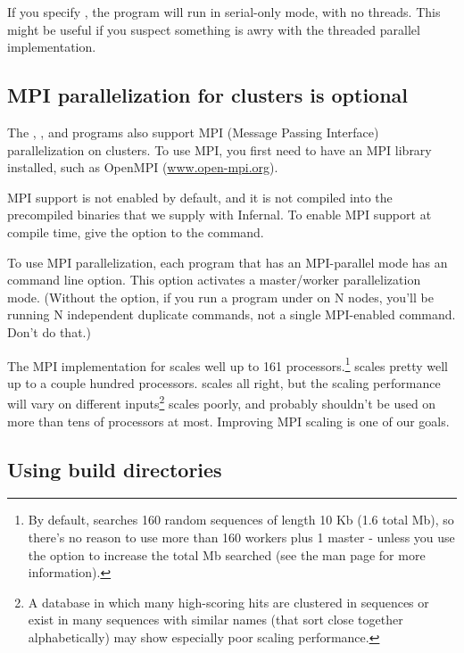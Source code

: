 If you specify , the program will run in serial-only
mode, with no threads. This might be useful if you suspect something
is awry with the threaded parallel implementation.

\subsection{MPI parallelization for clusters is optional}

The , ,  and
 programs also support MPI (Message Passing Interface)
parallelization on clusters.  To use MPI, you first need to have an
MPI library installed, such as OpenMPI (\url{www.open-mpi.org}). 

MPI support is not enabled by default, and it is not compiled into the
precompiled binaries that we supply with Infernal. To enable MPI support
at compile time, give the  option to the
 command.

To use MPI parallelization, each program that has an MPI-parallel mode
has an  command line option. This option activates a
master/worker parallelization mode. (Without the  option,
if you run a program under  on N nodes, you'll be
running N independent duplicate commands, not a single MPI-enabled
command. Don't do that.)

The MPI implementation for  scales well up to 161
processors.\footnote{By default,  searches 160
random sequences of length 10 Kb (1.6 total Mb), so there's no reason
to use more than 160 workers plus 1 master - unless you use the
 option to increase the total Mb searched (see the
 man page for more information).} 
scales pretty well up to a couple hundred processors. 
scales all right, but the scaling performance will vary on different
inputs\footnote{A database in which many high-scoring hits are
  clustered in sequences or exist in many sequences with similar names
  (that sort close together alphabetically) may show especially poor
  scaling performance.}  scales poorly, and probably
shouldn't be used on more than tens of processors at most. Improving
MPI scaling is one of our goals.

\subsection{Using build directories}


